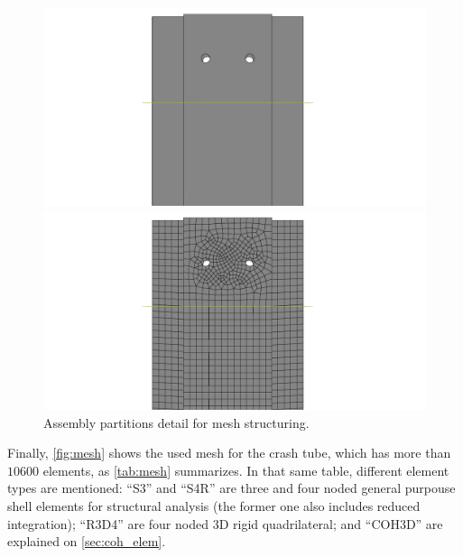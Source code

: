 \documentclass[cmfonts]{witpress}
\begin{document}
\begin{figure}
	\centering
	\begin{minipage}[b]{.48\linewidth}
		\centering
		\includegraphics[width=\linewidth]{figures/IMG_CUTRES/assembly_detail_holes}
	\end{minipage}
	\quad
	\begin{minipage}[b]{.48\linewidth}
		\centering
		\includegraphics[width=\linewidth]{figures/IMG_CUTRES/mesh_detail_holes}
	\end{minipage}
\caption{Assembly partitions detail for mesh structuring.}
\label{fig:mesh_part}
\end{figure}

Finally, \cref{fig:mesh} shows the used mesh for the crash tube, which has more than $\num{10600}$ elements, as \cref{tab:mesh} summarizes. In that same table, different element types are mentioned: ``S3'' and ``S4R'' are three and four noded general purpouse shell elements for structural analysis (the former one also includes reduced integration); ``R3D4'' are four noded 3D rigid quadrilateral; and ``COH3D'' are explained on \cref{sec:coh_elem}.
\end{document}
